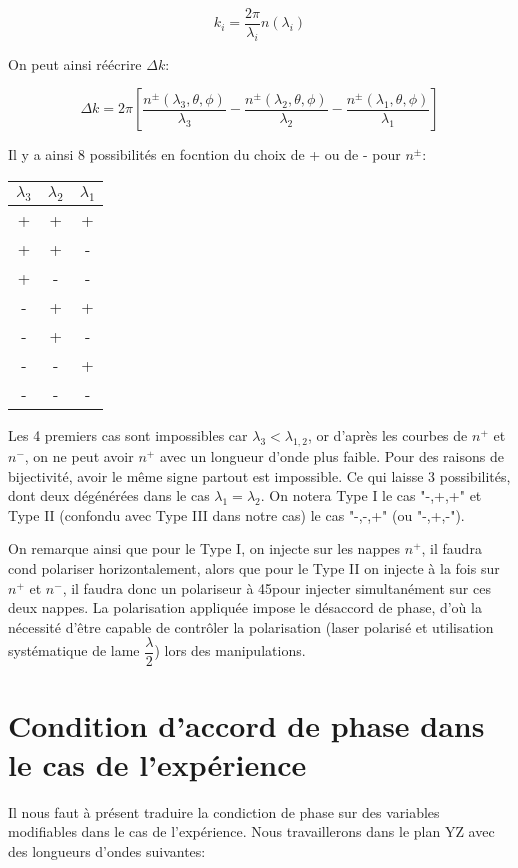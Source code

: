 \documentclass[a4paper,11pt]{report}
\begin{document}
\[k_i=\dfrac{2\pi}{\lambda_i}n(\lambda_i)\]

On peut ainsi réécrire $\Delta k$:

\[\Delta k=2\pi\left[\dfrac{n^{\pm}(\lambda_3,\theta,\phi)}{\lambda_3}-\dfrac{n^{\pm}(\lambda_2,\theta,\phi)}{\lambda_2}-\dfrac{n^{\pm}(\lambda_1,\theta,\phi)}{\lambda_1}\right]\]

Il y a ainsi 8 possibilités en focntion du choix de + ou de - pour $n^{\pm}$:

\begin{center}
\begin{tabular}{|c|c|c|}
$\lambda_3$&$\lambda_2$&$\lambda_1$\\
\hline
+&+&+\\
+&+&-\\
+&-&-\\
\hline
-&+&+\\
-&+&-\\
-&-&+\\
\hline
-&-&-\\
\end{tabular}
\end{center}

Les 4 premiers cas sont impossibles car $\lambda_3<\lambda_{1,2}$, or d'après les courbes de $n^+$ et $n^-$, on ne peut avoir $n^+$ avec un longueur d'onde plus faible. Pour des raisons de bijectivité, avoir le même signe partout est impossible. Ce qui laisse 3 possibilités, dont deux dégénérées dans le cas $\lambda_1=\lambda_2$. On notera Type I le cas "-,+,+" et Type II (confondu avec Type III dans notre cas) le cas "-,-,+" (ou "-,+,-").

On remarque ainsi que pour le Type I, on injecte sur les nappes $n^+$, il faudra cond polariser horizontalement, alors que pour le Type II on injecte à la fois sur $n^+$ et $n^-$, il faudra donc un polariseur à 45\textdegree pour injecter simultanément sur ces deux nappes. La polarisation appliquée impose le désaccord de phase, d'où la nécessité d'être capable de contrôler la polarisation (laser polarisé et utilisation systématique de lame $\dfrac{\lambda}{2}$) lors des manipulations.

\section{Condition d'accord de phase dans le cas de l'expérience}

Il nous faut à présent traduire la condiction de phase sur des variables modifiables dans le cas de l'expérience. Nous travaillerons dans le plan YZ avec des longueurs d'ondes suivantes:
\end{document}
